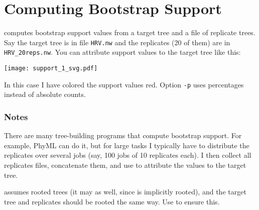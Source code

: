 \section{Computing Bootstrap Support}

\support{} computes bootstrap support values from a target tree and a file of
replicate trees. Say the target tree is in file \texttt{HRV.nw} and the
replicates (20 of them) are in \texttt{HRV\_20reps.nw}. You can attribute
support values to the target tree like this:


\texttt{[image: support\_1\_svg.pdf]}

In this case I have colored the support values red. Option \texttt{-p} uses
percentages instead of absolute counts.

\subsubsection{Notes}

There are many tree-building programs that compute bootstrap support. For
example, PhyML can do it, but for large tasks I typically have to distribute
the replicates over several jobs (say, 100 jobs of 10 replicates each). I then
collect all replicates files, concatenate them, and use \support{} to attribute
the values to the target tree.

\support{} assumes rooted trees (it may as well, since \nw{} is implicitly
rooted), and the target tree and replicates should be rooted the same way. Use
\reroot{} to ensure this.
